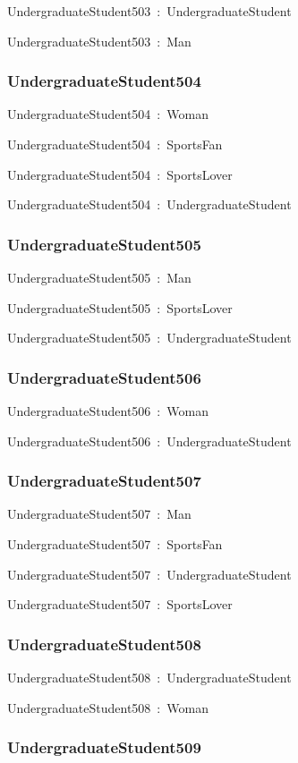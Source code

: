 \documentclass{article}
\begin{document}
UndergraduateStudent503~:~UndergraduateStudent

UndergraduateStudent503~:~Man

\subsubsection*{UndergraduateStudent504}

UndergraduateStudent504~:~Woman

UndergraduateStudent504~:~SportsFan

UndergraduateStudent504~:~SportsLover

UndergraduateStudent504~:~UndergraduateStudent

\subsubsection*{UndergraduateStudent505}

UndergraduateStudent505~:~Man

UndergraduateStudent505~:~SportsLover

UndergraduateStudent505~:~UndergraduateStudent

\subsubsection*{UndergraduateStudent506}

UndergraduateStudent506~:~Woman

UndergraduateStudent506~:~UndergraduateStudent

\subsubsection*{UndergraduateStudent507}

UndergraduateStudent507~:~Man

UndergraduateStudent507~:~SportsFan

UndergraduateStudent507~:~UndergraduateStudent

UndergraduateStudent507~:~SportsLover

\subsubsection*{UndergraduateStudent508}

UndergraduateStudent508~:~UndergraduateStudent

UndergraduateStudent508~:~Woman

\subsubsection*{UndergraduateStudent509}
\end{document}
